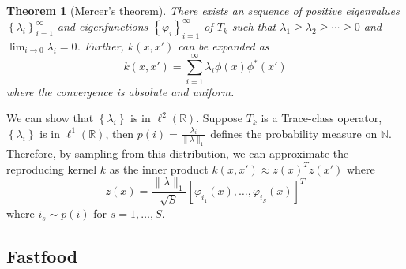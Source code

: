 \documentclass{amsart}
\newtheorem{theorem}{Theorem}[section]
\theoremstyle{definition}
\theoremstyle{remark}
\numberwithin{equation}{section}
\begin{document}
\begin{theorem}[Mercer's theorem]
There exists an sequence of positive eigenvalues $\left\{\lambda_i\right\}_{i=1}^\infty$ and eigenfunctions $\left\{\varphi_i\right\}_{i=1}^\infty$ of $T_k$ such that
$\lambda_1 \geq \lambda_2 \geq \cdots \geq 0$ and 
$\lim_{i\to 0} \lambda_i = 0$.
Further, $k(x, x')$ can be expanded as
\begin{equation}
k(x, x') = \sum_{i=1}^\infty \lambda_i \phi(x)\phi^\ast(x')
\end{equation}
where the convergence is absolute and uniform.
\end{theorem}
We can show that $\left\{ \lambda_i \right\}$ is in $\ell^2(\mathbb{R})$.
Suppose $T_k$ is a Trace-class operator, $\left\{\lambda_i\right\}$ is in $\ell^1(\mathbb{R})$, then $p(i) = \frac{\lambda_{i}}{\|\lambda\|_1}$ defines the probability measure on $\mathbb{N}$.
Therefore, by sampling from this distribution, we can approximate the reproducing kernel $k$ as the inner product $k(x, x') \approx z(x)^T z(x')$ where
\begin{equation}
z(x) = \frac{\|\lambda\|_1}{\sqrt{S}} \left[ \varphi_{i_1}(x), \ldots, \varphi_{i_S}(x) \right]^T
\end{equation}
where $i_s\sim p(i)$ for $s = 1,\ldots, S$.

\subsection{Fastfood}
\end{document}
